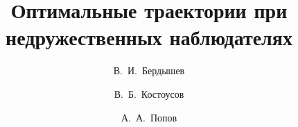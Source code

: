 \ifPDFTeX
\usepackage[T2A]{fontenc}
\usepackage[utf8]{inputenc} %
\usepackage[english,russian]{babel}
\fi





\usepackage[russian]{nla}

%
%


%



%
\fi

\title{Оптимальные траектории при недружественных наблюдателях}
\author{В.~И.~Бердышев   %
  \and  %
  В.~Б.~Костоусов 
  \and
  А.~А.~Попов 
} %


